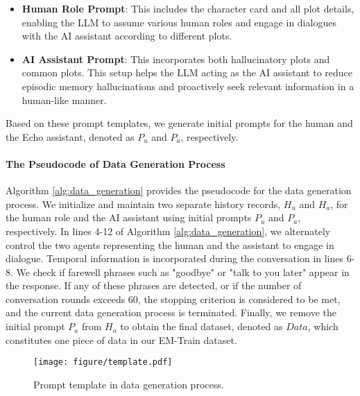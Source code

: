 \begin{itemize}
    \item \textbf{Human Role Prompt}: This includes the character card and all plot details, enabling the LLM to assume various human roles and engage in dialogues with the AI assistant according to different plots.
    
    \item \textbf{AI Assistant Prompt}: This incorporates both hallucinatory plots and common plots. This setup helps the LLM acting as the AI assistant to reduce episodic memory hallucinations and proactively seek relevant information in a human-like manner.
\end{itemize}

Based on these prompt templates, we generate initial prompts for the human and the Echo assistant, denoted as $P_u$ and $P_a$, respectively.


\paragraph{The Pseudocode of Data Generation Process}

Algorithm \ref{alg:data_generation} provides the pseudocode for the data generation process. We initialize and maintain two separate history records, $H_u$ and $H_a$, for the human role and the AI assistant using initial prompts $P_u$ and $P_a$, respectively. In lines 4-12 of Algorithm \ref{alg:data_generation}, we alternately control the two agents representing the human and the assistant to engage in dialogue. Temporal information is incorporated during the conversation in lines 6-8. We check if farewell phrases such as "goodbye" or "talk to you later" appear in the response. If any of these phrases are detected, or if the number of conversation rounds exceeds 60, the stopping criterion is considered to be met, and the current data generation process is terminated. Finally, we remove the initial prompt $P_a$ from $H_a$ to obtain the final dataset, denoted as $Data$, which constitutes one piece of data in our EM-Train dataset.

\begin{figure}[t!]
\centering

\texttt{[image: figure/template.pdf]} \\

\caption{Prompt template in data generation process.}
\label{fig:template}
\end{figure}

